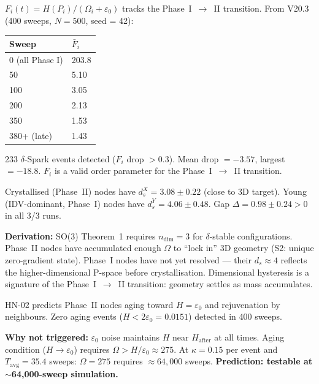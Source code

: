 \documentclass[12pt, a4paper]{article}
\begin{document}
\begin{derivedbox}[title={HN-01 Confirmed: $F_i$ Drops at $\delta$-Spark}]
$F_i(t) = H(P_i)/(\Omega_i + \varepsilon_0)$ tracks the Phase~I~$\to$~II transition.
From V20.3 (400 sweeps, $N = 500$, seed = 42):

\begin{center}
\renewcommand{\arraystretch}{1.3}
\begin{tabular}{ll}
\toprule
Sweep & $\bar{F}_i$ \\
\midrule
0 (all Phase I) & 203.8 \\
50 & 5.10 \\
100 & 3.05 \\
200 & 2.13 \\
350 & 1.53 \\
380+ (late) & 1.43 \\
\bottomrule
\end{tabular}
\end{center}

233 $\delta$-Spark events detected ($F_i$ drop $> 0.3$). Mean drop $= -3.57$,
largest $= -18.8$. $F_i$ is a valid order parameter for the Phase~I~$\to$~II transition.
\end{derivedbox}

\begin{derivedbox}[title={HN-04 Derived: Dimensional Hysteresis from SO(3) Theorem~1}]
Crystallised (Phase~II) nodes have $d_s^X = 3.08 \pm 0.22$ (close to 3D target).
Young (IDV-dominant, Phase~I) nodes have $d_s^Y = 4.06 \pm 0.48$.
Gap $\Delta = 0.98 \pm 0.24 > 0$ in all 3/3 runs.

\textbf{Derivation:} SO(3) Theorem~1 requires $n_{\mathrm{dim}} = 3$ for $\delta$-stable
configurations. Phase~II nodes have accumulated enough $\Omega$ to ``lock in'' 3D geometry
(S2: unique zero-gradient state). Phase~I nodes have not yet resolved --- their
$d_s \approx 4$ reflects the higher-dimensional P-space before crystallisation.
Dimensional hysteresis is a signature of the Phase~I~$\to$~II transition: geometry
settles as mass accumulates.
\end{derivedbox}

\begin{derivedbox}[title={HN-02 Not Triggered: Aging Requires $\sim$64,000 Sweeps}]
HN-02 predicts Phase~II nodes aging toward $H = \varepsilon_0$ and rejuvenation
by neighbours. Zero aging events ($H < 2\varepsilon_0 = 0.0151$) detected in 400 sweeps.

\textbf{Why not triggered:} $\varepsilon_0$ noise maintains $H$ near $H_{\mathrm{after}}$
at all times. Aging condition ($H \to \varepsilon_0$) requires $\Omega > H/\varepsilon_0
\approx 275$. At $\kappa = 0.15$ per event and $T_{\mathrm{avg}} = 35.4$ sweeps:
$\Omega = 275$ requires $\approx 64,000$ sweeps. \textbf{Prediction: testable at
$\sim$64,000-sweep simulation.}
\end{derivedbox}
\end{document}
